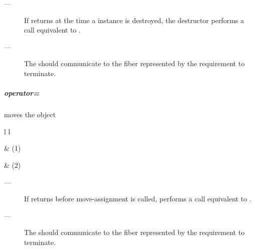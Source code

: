 \remarks
\begin{description}
    \item[---] If  returns  at the time a \fiber
               instance is destroyed, the destructor performs a call
               equivalent to .
    \item[---] The \cancelfn should communicate to the fiber represented by 
               the requirement to terminate. 
\end{description}

\subparagraph*{operator=}
moves the \fiber object

\begin{tabular}{ l l }
    \midrule

     & (1)\\

    \midrule

     & (2)\\

    \midrule
\end{tabular}

\remarks
\begin{description}
    \item[---] If  returns  before move-assignment is
               called,  performs a call
               equivalent to .
    \item[---] The \cancelfn should communicate to the fiber represented by 
               the requirement to terminate. 
\end{description}

